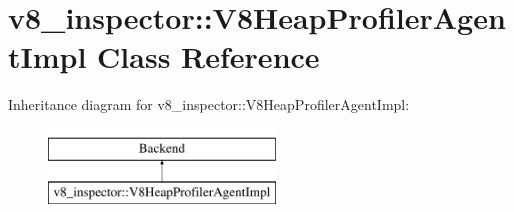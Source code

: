 \hypertarget{classv8__inspector_1_1V8HeapProfilerAgentImpl}{}\section{v8\+\_\+inspector\+:\+:V8\+Heap\+Profiler\+Agent\+Impl Class Reference}
\label{classv8__inspector_1_1V8HeapProfilerAgentImpl}
Inheritance diagram for v8\+\_\+inspector\+:\+:V8\+Heap\+Profiler\+Agent\+Impl\+:\begin{figure}[H]
\begin{center}
\leavevmode
\includegraphics[height=2.000000cm]{classv8__inspector_1_1V8HeapProfilerAgentImpl}
\end{center}
\end{figure}

